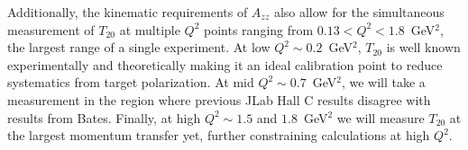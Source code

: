 Additionally, the kinematic requirements of $A_{zz}$ also allow for the simultaneous measurement of $T_{20}$ at multiple $Q^2$ points ranging from $0.13<Q^2<1.8$~GeV$^2$, the largest range of a single experiment. At low $Q^2\sim0.2$~GeV$^2$, $T_{20}$ is well known experimentally and theoretically making it an ideal calibration point to reduce systematics from target polarization. At mid $Q^2\sim0.7$~GeV$^2$, we will take a measurement in the region where previous JLab Hall C results disagree with results from Bates. Finally, at high $Q^2\sim1.5$ and $1.8$~GeV$^2$ we will measure $T_{20}$ at the largest momentum transfer yet, further constraining calculations at high $Q^2$.








